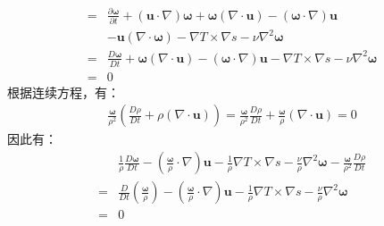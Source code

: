 \begin{enumerate}
\begin{equation}
\begin{aligned}
                =& \frac{\partial \boldsymbol{\omega}}{\partial t} + (\mathbf{u} \cdot \nabla) \boldsymbol{\omega} 
                + \boldsymbol{\omega}(\nabla \cdot \mathbf{u}) - (\boldsymbol{\omega} \cdot \nabla) \mathbf{u} \\
                &- \mathbf{u}(\nabla \cdot \boldsymbol{\omega})
                - \nabla T \times \nabla s
                - \nu \nabla^{2} \boldsymbol{\omega} \\
                =& \frac{D \boldsymbol{\omega}}{D t}
                + \boldsymbol{\omega}(\nabla \cdot \mathbf{u})
                - (\boldsymbol{\omega} \cdot \nabla) \mathbf{u}
                - \nabla T \times \nabla s
                - \nu \nabla^{2} \boldsymbol{\omega} \\
                =& 0 
            \end{aligned}
        \end{equation}
        根据连续方程，有：
        \begin{equation}
            \begin{aligned}
                \frac{\boldsymbol{\omega}}{\rho^{2}} ( \frac{D \rho }{D t} + \rho ( \nabla \cdot \mathbf{u} ) )
                = \frac{\boldsymbol{\omega}}{\rho^{2}} \frac{D \rho }{D t} + \frac{\boldsymbol{\omega}}{\rho} ( \nabla \cdot \mathbf{u} ) 
                = 0
            \end{aligned}
        \end{equation}
        因此有：
        \begin{equation}
            \begin{aligned}
                &\frac{1}{\rho} \frac{D \boldsymbol{\omega}}{D t}
                - (\frac{\boldsymbol{\omega}}{\rho} \cdot \nabla) \mathbf{u}
                - \frac{1}{\rho} \nabla T \times \nabla s
                - \frac{\nu}{\rho} \nabla^{2} \boldsymbol{\omega}
                - \frac{\boldsymbol{\omega}}{\rho^{2}} \frac{D \rho }{D t} \\
                =& \frac{D}{D t}\left(\frac{\boldsymbol{\omega}}{\rho}\right)-\left(\frac{\boldsymbol{\omega}}{\rho} \cdot \nabla\right) \mathbf{u}-\frac{1}{\rho} \nabla T \times \nabla s-\frac{\nu}{\rho} \nabla^{2} \boldsymbol{\omega} \\
                =& 0
            \end{aligned}
        \end{equation}
        

\end{enumerate}
